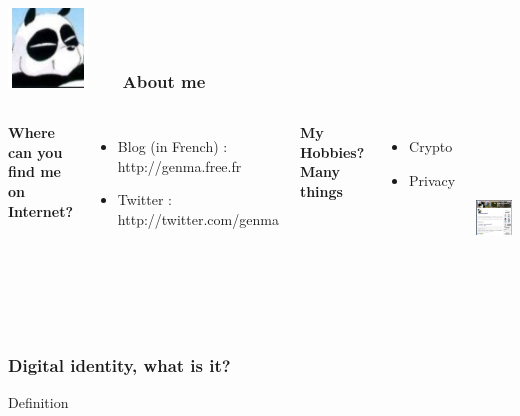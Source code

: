 
\begin{frame}
\frametitle{\includegraphics[scale=0.4]{./materials/Genma.jpg} \ \ \  About me }
\begin{columns}[c] 

\textbf{Where can you find me on Internet?}
\begin{itemize}
\item Blog (in French) : http://genma.free.fr
\item Twitter : http://twitter.com/genma
\end{itemize}

\textbf{My Hobbies? Many things}
\begin{itemize}
\item Crypto
\item Privacy
\end{itemize}

\includegraphics[width=5cm,height=5cm]{./materials/blog.png} 
\end{columns}
\end{frame}


\begin{frame}
\frametitle{Digital identity, what is it?}


\begin{block}{Definition}
\begin{itemize}
\end{itemize}
\end{block}
\end{frame}

